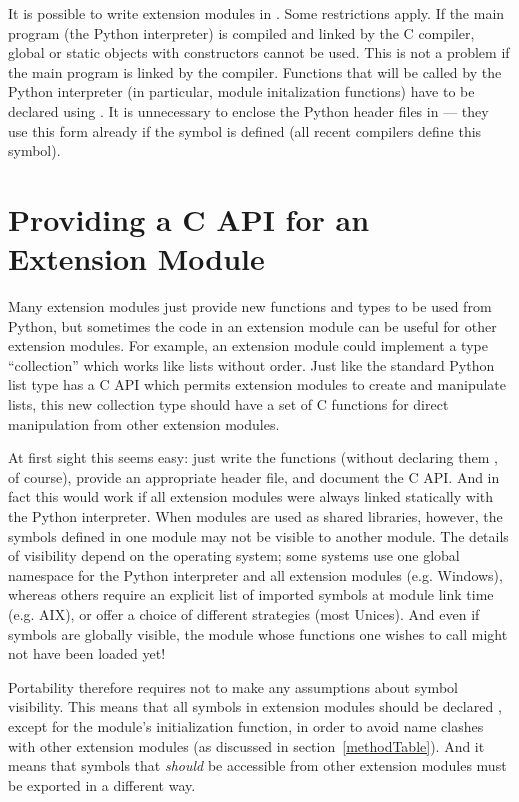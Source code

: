 \documentclass{manual}
\begin{document}
It is possible to write extension modules in \Cpp{}.  Some restrictions
apply.  If the main program (the Python interpreter) is compiled and
linked by the C compiler, global or static objects with constructors
cannot be used.  This is not a problem if the main program is linked
by the \Cpp{} compiler.  Functions that will be called by the
Python interpreter (in particular, module initalization functions)
have to be declared using .
It is unnecessary to enclose the Python header files in
 --- they use this form already if the symbol
 is defined (all recent \Cpp{} compilers define this
symbol).


\section{Providing a C API for an Extension Module
         \label{using-cobjects}}

Many extension modules just provide new functions and types to be
used from Python, but sometimes the code in an extension module can
be useful for other extension modules. For example, an extension
module could implement a type ``collection'' which works like lists
without order. Just like the standard Python list type has a C API
which permits extension modules to create and manipulate lists, this
new collection type should have a set of C functions for direct
manipulation from other extension modules.

At first sight this seems easy: just write the functions (without
declaring them , of course), provide an appropriate
header file, and document the C API. And in fact this would work if
all extension modules were always linked statically with the Python
interpreter. When modules are used as shared libraries, however, the
symbols defined in one module may not be visible to another module.
The details of visibility depend on the operating system; some systems
use one global namespace for the Python interpreter and all extension
modules (e.g. Windows), whereas others require an explicit list of
imported symbols at module link time (e.g. AIX), or offer a choice of
different strategies (most Unices). And even if symbols are globally
visible, the module whose functions one wishes to call might not have
been loaded yet!

Portability therefore requires not to make any assumptions about
symbol visibility. This means that all symbols in extension modules
should be declared , except for the module's
initialization function, in order to avoid name clashes with other
extension modules (as discussed in section~\ref{methodTable}). And it
means that symbols that \emph{should} be accessible from other
extension modules must be exported in a different way.
\end{document}
